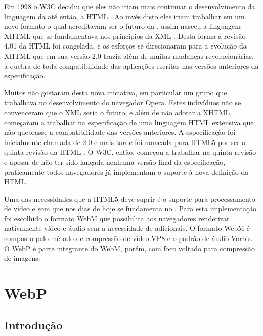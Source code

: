 \documentclass[espaco=simples,appendix=Name]{abnt}
\begin{document}
Em 1998 o W3C decidiu que eles não iriam mais continuar o desenvolvimento da linguagem da  até então, a HTML . Ao invés disto eles iriam trabalhar em um novo formato o qual acreditavam ser o futuro da , assim nasceu a linguagem XHTML  que se fundamentava nos princípios da XML . Desta forma a revisão 4.01 da HTML foi congelada, e os esforços se direcionaram para a evolução da XHTML que em sua versão 2.0 trazia além de muitas mudanças revolucionárias, a quebra de toda compatibilidade das aplicações escritas nas versões anteriores da especificação.

Muitos não gostaram desta nova iniciativa, em particular um grupo que trabalhava no desenvolvimento do navegador Opera. Estes indivíduos não se convenceram que o XML seria o futuro, e além de não adotar a XHTML, começaram a trabalhar na especificação de uma linguagem HTML extensiva que não quebrasse a compatibilidade das versões anteriores.  A especificação foi inicialmente chamada de  2.0 e mais tarde foi nomeada para HTML5 por ser a quinta revisão da HTML \cite{HTML5Intro}. O W3C, então, começou a trabalhar na quinta revisão e apesar de não ter sido lançada nenhuma versão final da especificação, praticamente todos navegadores já implementam o suporte à nova definição da HTML.

Uma das necessidades que a HTML5 deve suprir é o suporte para processamento de vídeo e som que nos dias de hoje se fundamenta no . Para esta implementação foi escolhido o formato WebM que possibilita aos navegadores renderizar nativamente vídeo e áudio sem a necessidade de  adicionais. O formato WebM é composto pelo método de compressão de vídeo VP8 e o padrão de áudio Vorbis. O WebP é parte integrante do WebM, porém, com foco voltado para compressão de imagens.

\chapter{WebP}

\section{Introdução}
\end{document}
